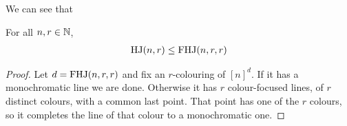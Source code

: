 We can see that
\begin{boxlemma} \label{Ch6:Lemma:HJ_le_FHJ}
    For all $n, r \in \mathbb{N}$,
    \begin{align*}
        \operatorname{HJ}(n, r) \le \operatorname{FHJ}(n, r, r)
    \end{align*}
\end{boxlemma}
\begin{proof}
    Let $d = \operatorname{FHJ}(n, r, r)$ and fix an $r$-colouring of $[n]^d$. If it has a monochromatic line we are done. Otherwise it has $r$ colour-focused lines, of $r$ distinct colours, with a common last point. That point has one of the $r$ colours, so it completes the line of that colour to a monochromatic one.
\end{proof}

